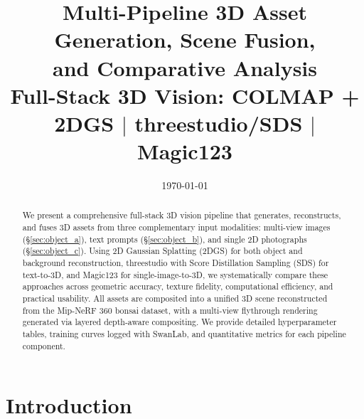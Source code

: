 \documentclass{article}
\title{\textbf{Multi-Pipeline 3D Asset Generation, Scene Fusion,} \\
       \textbf{and Comparative Analysis} \\
\large Full-Stack 3D Vision: COLMAP + 2DGS $\mid$ threestudio/SDS $\mid$ Magic123}
\author{}
\date{\today}
\begin{document}
\maketitle

\noindent
\begin{minipage}{\textwidth}
\centering
{}
\end{minipage}
\vspace{10pt}

\begin{abstract}
We present a comprehensive full-stack 3D vision pipeline that generates, reconstructs,
and fuses 3D assets from three complementary input modalities: multi-view images
(\S\ref{sec:object_a}), text prompts (\S\ref{sec:object_b}), and single 2D photographs
(\S\ref{sec:object_c}). Using 2D Gaussian Splatting (2DGS) for both object and background
reconstruction, threestudio with Score Distillation Sampling (SDS) for text-to-3D, and
Magic123 for single-image-to-3D, we systematically compare these approaches across
geometric accuracy, texture fidelity, computational efficiency, and practical usability.
All assets are composited into a unified 3D scene reconstructed from the Mip-NeRF 360
bonsai dataset, with a multi-view flythrough rendering generated via layered
depth-aware compositing. We provide detailed hyperparameter tables, training curves
logged with SwanLab, and quantitative metrics for each pipeline component.
\end{abstract}

\section{Introduction}
\end{document}
